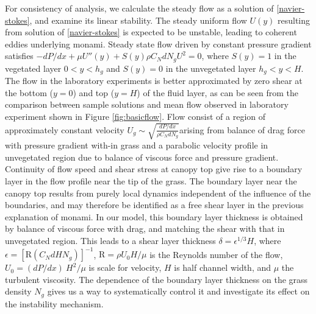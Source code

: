 \documentclass[aps,prl,twocolumn,showpacs,superscriptaddress,groupedaddress,10pt]{revtex4-1}  %
\newcommand{\hg}{h_g}
\newcommand{\Rey}{\text{R}}
\begin{document}
For consistency of analysis, we calculate the steady flow as a solution of \eqref{navier-stokes}, and examine its linear stability. The steady uniform flow $U(y)$ resulting from solution of \eqref{navier-stokes} is expected to be unstable, leading to coherent eddies underlying monami. Steady state flow driven by constant pressure gradient satisfies
$-{dP}/{dx}+\mu U''(y) +S(y) \rho C_N d N_gU^2=0$, where $S(y)=1$ in the vegetated layer $0<y<\hg$ and $S(y)=0$ in the unvegetated layer $\hg< y< H$. 
The flow in the laboratory experiments is better approximated by zero shear at the bottom ($y=0$) and top ($y=H$) of the fluid layer, as can be seen from the comparison 
between sample solutions and mean flow observed in laboratory experiment shown in Figure \ref{fig:basicflow}. Flow consist of a region of approximately constant velocity
\small$U_g \sim \sqrt{\frac{dP/dx}{\rho C_N dN_g}}$\normalsize arising from balance of drag force with pressure gradient with-in grass and a parabolic velocity 
profile in unvegetated region due to balance of viscous force and pressure gradient. Continuity of flow speed and shear stress at canopy top 
give rise to a boundary layer in the flow profile near the tip of the grass. The boundary layer near the canopy top results from purely local dynamics independent of the influence of the boundaries, and may therefore be identified as a free shear layer\cite{Ghisal02} in the previous explanation of monami. 
In our model, this boundary layer thickness is obtained by balance of viscous force with drag, and matching the shear with that in unvegetated region. This leads to a shear layer 
thickness $\delta = \epsilon^{1/3} H$, where $\epsilon = \left[\Rey (C_N d H N_g)\right]^{-1}$, $\Rey=\rho U_0 H/\mu$ is the Reynolds number of the flow, $U_0 = {(dP/dx)~H^2}/{\mu}$ is scale for velocity,
$H$ is half channel width, and $\mu$ the turbulent viscosity. The dependence of the boundary layer thickness on the grass density $N_g$ gives us a way to systematically control it and investigate its effect on the instability mechanism. 
\end{document}

